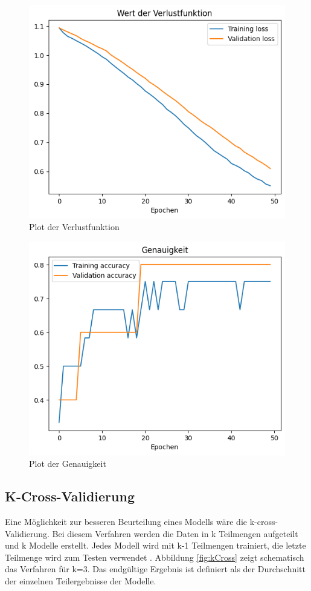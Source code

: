 \begin{figure}[H]
    \centering
    \includegraphics[width=.75\textwidth]{abbildungen/PlotLoss.png}
    \caption{Plot der Verlustfunktion}
    \label{fig:plotLoss}
\end{figure}
\begin{figure}[H]
    \centering
    \includegraphics[width=.75\textwidth]{abbildungen/PlotAcc.png}
    \caption{Plot der Genauigkeit}
    \label{fig:plotAcc}
\end{figure}

\subsection{K-Cross-Validierung}
\label{chap:kCross}

Eine Möglichkeit zur besseren Beurteilung eines Modells wäre die k-cross-Validierung. Bei diesem Verfahren werden die Daten in k Teilmengen aufgeteilt
und k Modelle erstellt. Jedes Modell wird mit k-1 Teilmengen trainiert, die letzte Teilmenge wird zum Testen verwendet \cite[vgl. S.121f.]{DL_PY}. Abbildung \ref*{fig:kCross} zeigt
schematisch das Verfahren für k=3. Das endgültige Ergebnis ist definiert als der Durchschnitt der einzelnen Teilergebnisse der Modelle. 

